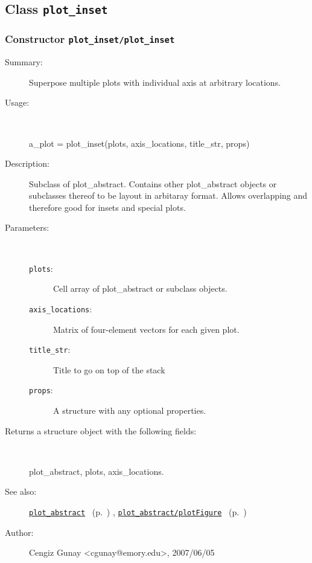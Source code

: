 \subsection{Class \texttt{plot\_inset}}%
%
\label{ref_plot_inset}%
\hypertarget{ref_plot_inset}{}%
\subsubsection[Constructor \texttt{plot\_inset}]{Constructor \texttt{plot\_inset/plot\_inset}}%
%
\label{ref_plot_inset__plot_inset}%
\hypertarget{ref_plot_inset__plot_inset}{}%
\begin{description}
\item[Summary:]Superpose multiple plots with individual axis at arbitrary locations.
%
\item[Usage:]~%
\begin{lyxcode}%
a\_plot = plot\_inset(plots, axis\_locations, title\_str, props)
%
\end{lyxcode}%
%
\item[Description:]%
Subclass of plot\_abstract. Contains other plot\_abstract objects or
 subclasses thereof to be layout in arbitaray format. Allows overlapping
 and therefore good for insets and special plots.
\item[Parameters:]~
\begin{description}%
\item[\texttt{plots}:]
 Cell array of plot\_abstract or subclass objects.
\item[\texttt{axis\_locations}:]
 Matrix of four-element vectors for each given plot.
\item[\texttt{title\_str}:]
 Title to go on top of the stack
\item[\texttt{props}:]
 A structure with any optional properties.
\end{description}%
%
\item[Returns a structure object with the following fields:]~

	plot\_abstract, plots, axis\_locations.
%
%
\item[See also:]%
\hyperlink{ref_plot_abstract}{\texttt{plot\_abstract}}%
\ (p.~\pageref{ref_plot_abstract})%
%
, \hyperlink{ref_plot_abstract__plotFigure}{\texttt{plot\_abstract/plotFigure}}%
\ (p.~\pageref{ref_plot_abstract__plotFigure})%
%
%
\item[Author:]%
Cengiz Gunay <cgunay@emory.edu>, 2007/06/05%
\end{description}
\methodline%
